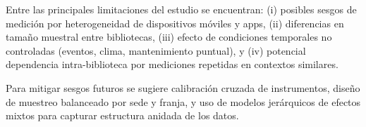 Entre las principales limitaciones del estudio se encuentran: (i) posibles sesgos de medición por heterogeneidad de dispositivos móviles y apps, (ii) diferencias en tamaño muestral entre bibliotecas, (iii) efecto de condiciones temporales no controladas (eventos, clima, mantenimiento puntual), y (iv) potencial dependencia intra-biblioteca por mediciones repetidas en contextos similares.

Para mitigar sesgos futuros se sugiere calibración cruzada de instrumentos, diseño de muestreo balanceado por sede y franja, y uso de modelos jerárquicos de efectos mixtos para capturar estructura anidada de los datos.
